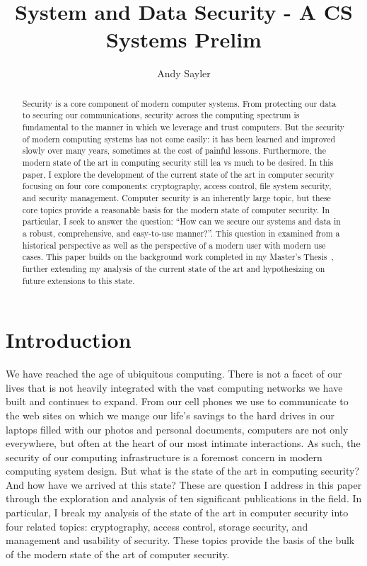 \documentclass{sig-alternate}
\begin{document}
\title{System and Data Security - A CS Systems Prelim}

\author{
  \alignauthor
  Andy Sayler\\
}

\maketitle

\begin{abstract}
Security is a core component of modern computer systems. From
protecting our data to securing our communications, security across
the computing spectrum is fundamental to the manner in which we
leverage and trust computers. But the security of modern computing
systems has not come easily: it has been learned and improved slowly
over many years, sometimes at the cost of painful
lessons. Furthermore, the modern state of the art in computing
security still lea vs much to be desired. In this paper, I explore the
development of the current state of the art in computer security
focusing on four core components: cryptography, access control, file
system security, and security management. Computer security is an
inherently large topic, but these core topics provide a reasonable
basis for the modern state of computer security. In particular, I seek
to answer the question: ``How can we secure our systems and data in a
robust, comprehensive, and easy-to-use manner?''. This question in
examined from a historical perspective as well as the perspective of a
modern user with modern use cases. This paper builds on the background
work completed in my Master's Thesis~\cite{custos-masters}, further
extending my analysis of the current state of the art and
hypothesizing on future extensions to this state.
\end{abstract}

\section{Introduction}
\label{sec:intro}

We have reached the age of ubiquitous computing. There is not a facet
of our lives that is not heavily integrated with the vast computing
networks we have built and continues to expand. From our cell phones
we use to communicate to the web sites on which we mange our life's
savings to the hard drives in our laptops filled with our photos and
personal documents, computers are not only everywhere, but often at
the heart of our most intimate interactions. As such, the security of
our computing infrastructure is a foremost concern in modern computing
system design. But what is the state of the art in computing security?
And how have we arrived at this state? These are question I address in
this paper through the exploration and analysis of ten significant
publications in the field. In particular, I break my analysis of the
state of the art in computer security into four related topics:
cryptography, access control, storage security, and management and
usability of security. These topics provide the basis of the bulk of
the modern state of the art of computer security.
\end{document}
